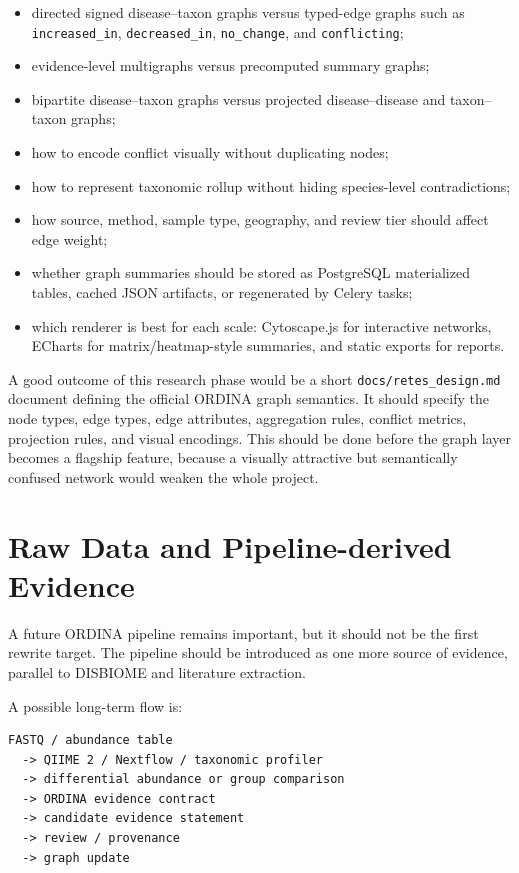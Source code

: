 \documentclass[11pt,a4paper]{article}
\begin{document}
\begin{itemize}[noitemsep]
    \item directed signed disease--taxon graphs versus typed-edge graphs such as \texttt{increased\_in}, \texttt{decreased\_in}, \texttt{no\_change}, and \texttt{conflicting};
    \item evidence-level multigraphs versus precomputed summary graphs;
    \item bipartite disease--taxon graphs versus projected disease--disease and taxon--taxon graphs;
    \item how to encode conflict visually without duplicating nodes;
    \item how to represent taxonomic rollup without hiding species-level contradictions;
    \item how source, method, sample type, geography, and review tier should affect edge weight;
    \item whether graph summaries should be stored as PostgreSQL materialized tables, cached JSON artifacts, or regenerated by Celery tasks;
    \item which renderer is best for each scale: Cytoscape.js for interactive networks, ECharts for matrix/heatmap-style summaries, and static exports for reports.
\end{itemize}

A good outcome of this research phase would be a short \texttt{docs/retes\_design.md} document defining the official ORDINA graph semantics. It should specify the node types, edge types, edge attributes, aggregation rules, conflict metrics, projection rules, and visual encodings. This should be done before the graph layer becomes a flagship feature, because a visually attractive but semantically confused network would weaken the whole project.

\section{Raw Data and Pipeline-derived Evidence}

A future ORDINA pipeline remains important, but it should not be the first rewrite target. The pipeline should be introduced as one more source of evidence, parallel to DISBIOME and literature extraction.

A possible long-term flow is:

\begin{verbatim}
FASTQ / abundance table
  -> QIIME 2 / Nextflow / taxonomic profiler
  -> differential abundance or group comparison
  -> ORDINA evidence contract
  -> candidate evidence statement
  -> review / provenance
  -> graph update
\end{verbatim}
\end{document}
